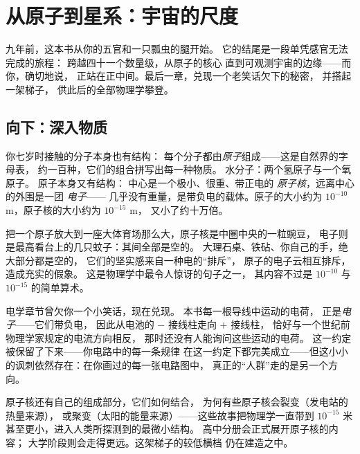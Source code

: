\chapter{从原子到星系：宇宙的尺度}\label{ch:g9:atoms-to-galaxies}

九年前，这本书从你的五官和一只瓢虫的腿开始。
它的结尾是一段单凭感官无法完成的旅程：
跨越四十一个数量级，从原子的核心
直到可观测宇宙的边缘——而你，确切地说，
正站在正中间。最后一章，兑现一个老笑话欠下的秘密，
并搭起一架梯子，
供此后的全部物理学攀登。

\section{向下：深入物质}

\begin{definition}[原子]\label{def:g9:atoms-to-galaxies:atom}
你七岁时接触的分子本身也有结构：
每个分子都由\emph{原子}组成——这是自然界的字母表，
约一百种，它们的组合拼写出每一种物质。
水分子：两个氢原子与一个氧原子。
原子本身又有结构：
中心是一个极小、很重、带正电的
\emph{原子核}，远离中心的外围是一团
\emph{电子}——
几乎没有重量，是带负电的载体。原子的大小约为
$10^{-10}$ \unit{m}，原子核的大小约为 $10^{-15}$ \unit{m}，
又小了约十万倍。
\end{definition}

\begin{proposition}[物质主要是空的]\label{prop:g9:atoms-to-galaxies:empty}
把一个原子放大到一座大体育场那么大，原子核是中圈中央的一粒豌豆，
电子则是最高看台上的几只蚊子：其间全部是空的。
大理石桌、铁砧、你自己的手，绝大部分都是空的，
它们的坚实感来自一种电的“排斥”，
原子的电子云相互排斥，造成充实的假象。
这是物理学中最令人惊讶的句子之一，
其内容不过是
$10^{-10}$ 与 $10^{-15}$ 的简单算术。
\end{proposition}

\begin{example}[旧笑话的兑现]\label{ex:g9:atoms-to-galaxies:electron}
电学章节曾欠你一个小笑话，现在兑现。
本书每一根导线中运动的电荷，
正是\emph{电子}——它们带负电，
因此从电池的 $-$ 接线柱走向 $+$ 接线柱，
恰好与一个世纪前物理学家规定的电流方向相反，
那时还没有人能询问这些运动的电荷。
这一约定被保留了下来——你电路中的每一条规律
在这一约定下都完美成立——但这小小的讽刺依然存在：在你画过的每一张电路图中，
真正的“人群”走的是另一个方向。
\end{example}

\begin{example}[再往下]\label{ex:g9:atoms-to-galaxies:deeper}
原子核还有自己的组成部分，它们如何结合，
为何有些原子核会裂变（发电站的热量来源），
或聚变（太阳的能量来源）——这些故事把物理学一直带到 $10^{-15}$
米甚至更小，进入人类所探测到的最微小结构。
高中分册会正式展开原子核的内容；
大学阶段则会走得更远。这架梯子的较低横档
仍在建造之中。
\end{example}

